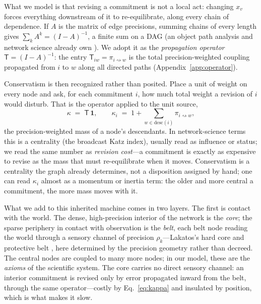 \documentclass[runningheads]{llncs}
\newcommand{\desc}{\mathrm{desc}}
\newcommand{\rw}{\rightsquigarrow}
\newcommand{\Top}{\mathsf{T}}          %
\newcommand{\bone}{\mathbf{1}}         %
\begin{document}
What we model is that revising a commitment is not a local act: changing $x_v$ forces
everything downstream of it to re-equilibrate, along every chain of dependence. If $A$ is the
matrix of edge precisions, summing chains of every length gives $\sum_k A^k=(I-A)^{-1}$, a
finite sum on a DAG (an object path analysis and network science already own
\citep{wright1934,bollen1987,katz1953,bonacich1987,malioutov2006}). We adopt it as the
\emph{propagation operator}
$\Top=(I-A)^{-1}$: the entry $\Top_{iw}=\pi_{i\rw w}$ is the total precision-weighted coupling
propagated from $i$ to $w$ along all directed paths (Appendix~\ref{app:operator}).

Conservatism is then recognized rather than posited. Place a unit of weight on every node and ask,
for each commitment $i$, how much total weight a revision of $i$ would disturb. That is the operator
applied to the unit source,
\begin{equation}
\kappa \;=\; \Top\,\bone,
\qquad
\kappa_i \;=\;1+\!\!\sum_{w\in\desc(i)}\!\!\pi_{i\rw w},
\label{eq:kappa}
\end{equation}
the precision-weighted mass of a node's descendants. In network-science terms this is a
centrality (the broadcast Katz index), usually read as influence or status; we read the same
number as \emph{revision cost}---a commitment is exactly as expensive to revise as the mass that
must re-equilibrate when it moves. Conservatism is a centrality the graph already determines,
not a disposition assigned by hand; one can read $\kappa_i$ almost as a momentum or inertia
term: the older and more central a commitment, the more mass moves with it.

What we add to this inherited machine comes in two layers. The first is contact with the world. The
dense, high-precision interior of the network is the \emph{core}; the sparse periphery in contact
with observation is the \emph{belt}, each belt node reading the world through a sensory channel of
precision $\rho_k$---Lakatos's hard core and protective belt \citep{lakatos1970}, here
determined by the precision geometry rather than decreed. The central nodes are coupled to
many more nodes; in our model, these are the \emph{axioms} of the scientific system. The core
carries no direct sensory
channel: an interior commitment is revised only by error propagated inward from the belt,
through the same operator---costly by Eq.~\eqref{eq:kappa} and insulated by position, which is
what makes it slow.
\end{document}
